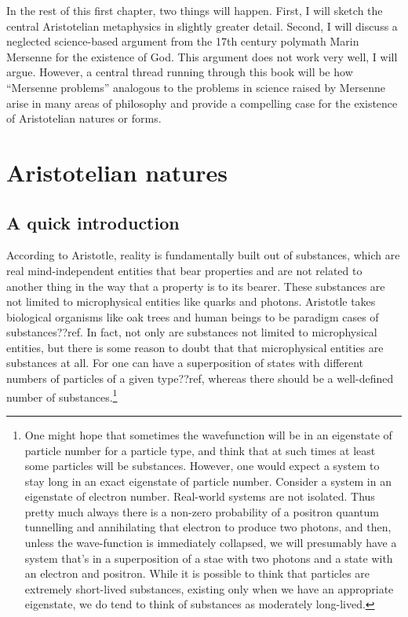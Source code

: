 In the rest of this first chapter, two things will happen. First, I will sketch the central Aristotelian metaphysics in slightly
greater detail. Second, I will discuss a neglected science-based argument from the 17th century polymath Marin Mersenne for the existence 
of God. This argument does not work very well, I will argue. However, a central thread running through this book will be how ``Mersenne 
problems'' analogous to the problems in science raised by Mersenne arise in many areas of philosophy and provide a compelling 
case for the existence of Aristotelian natures or forms.

\section{Aristotelian natures}
\subsection{A quick introduction}
According to Aristotle, reality is fundamentally built out of substances, which are real mind-independent entities that
bear properties and are not related to another thing in the way that a property is to its bearer.
These substances are not limited to microphysical entities like quarks and photons. Aristotle takes biological organisms 
like oak trees and human beings to be paradigm cases of substances??ref. In fact, not only are substances not limited to 
microphysical entities, but there is some reason to doubt that that microphysical entities are substances at all. For 
one can have a superposition of states with different numbers of particles of a given type??ref, whereas there should be a well-defined 
number of substances.\footnote{One might hope that sometimes the wavefunction will be in an eigenstate of particle
number for a particle type, and think that at such times at least some particles will be substances. However, one would expect a system
to stay long in an exact eigenstate of particle number. Consider a system in an eigenstate of electron number. Real-world
systems are not isolated. Thus pretty much always there is a non-zero probability of a positron quantum tunnelling and annihilating
that electron to produce two photons, and then, unless the wave-function is immediately collapsed, we will presumably have 
a system that's in a superposition of a stae with two photons and a state with an electron and positron. While it is possible
to think that particles are extremely short-lived substances, existing only when we have an appropriate eigenstate, we do tend
to think of substances as moderately long-lived.}

